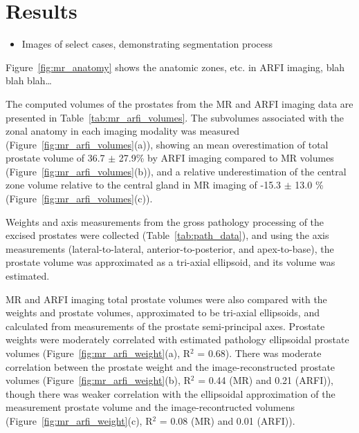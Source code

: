 \section{Results}\label{sect:results}


\begin{itemize}
    \item Images of select cases, demonstrating segmentation process
\end{itemize}

Figure~\ref{fig:mr_anatomy} shows the anatomic zones, etc. in ARFI imaging, blah blah blah\ldots



The computed volumes of the prostates from the MR and ARFI imaging data are
presented in Table~\ref{tab:mr_arfi_volumes}.  The subvolumes associated
with the zonal anatomy in each imaging modality was measured
(Figure~\ref{fig:mr_arfi_volumes}(a)), showing an mean overestimation of
total prostate volume of 36.7 $\pm$ 27.9\% by ARFI imaging compared to MR
volumes (Figure~\ref{fig:mr_arfi_volumes}(b)), and a relative
underestimation of the central zone volume relative to the central gland in MR
imaging of -15.3 $\pm$ 13.0 \% (Figure~\ref{fig:mr_arfi_volumes}(c)).





Weights and axis measurements from the gross pathology processing of the
excised prostates were collected (Table~\ref{tab:path_data}), and using the
axis measurements (lateral-to-lateral, anterior-to-posterior, and
apex-to-base), the prostate volume was approximated as a tri-axial ellipsoid,
and its volume was estimated.



MR and ARFI imaging total prostate volumes were also compared with the weights
and prostate volumes, approximated to be tri-axial ellipsoids, and calculated
from measurements of the prostate semi-principal axes.  Prostate weights were
moderately correlated with estimated pathology ellipsoidal prostate volumes
(Figure~\ref{fig:mr_arfi_weight}(a), R$^2$ = 0.68).  There was moderate
correlation between the prostate weight and the image-reconstructed prostate
volumes (Figure~\ref{fig:mr_arfi_weight}(b), R$^2$ = 0.44 (MR) and 0.21
(ARFI)), though there was weaker correlation with the ellipsoidal approximation
of the measurement prostate volume and the image-recontructed volumens
(Figure~\ref{fig:mr_arfi_weight}(c), R$^2$ = 0.08 (MR) and 0.01 (ARFI)).  

